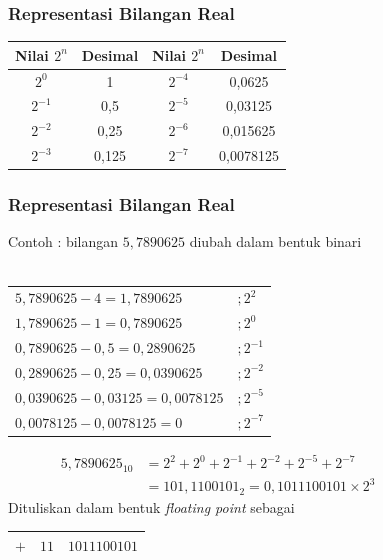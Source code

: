 \documentclass{beamer}
\begin{document}
\begin{frame}
\frametitle{Representasi Bilangan Real}
\begin{center}
\begin{tabular}{|c|c|c|c|}
\hline
	Nilai $2^n$ & Desimal & Nilai $2^n$ & Desimal\\
\hline
	$2^{0}$ & 1 & $2^{-4}$ & 0,0625\\
\hline
	$2^{-1}$ & 0,5 & $2^{-5}$ & 0,03125\\
\hline
	$2^{-2}$ & 0,25 & $2^{-6}$ & 0,015625\\
\hline
	$2^{-3}$ & 0,125 & $2^{-7}$ & 0,0078125\\
\hline
\end{tabular}
\end{center}
\end{frame}


\begin{frame}
\frametitle{Representasi Bilangan Real}
Contoh : bilangan $5,7890625$ diubah dalam bentuk binari\\\ \\
\begin{tabular}{ll}
$5,7890625 - \boxed{4} = 1,7890625 $&$;2^{2}$
\\$1,7890625 - \boxed{1} = 0,7890625 $&$;2^{0}$
\\$0,7890625 - \boxed{0,5} = 0,2890625 $&$;2^{-1}$
\\$0,2890625 - \boxed{0,25} = 0,0390625 $&$;2^{-2}$
\\$0,0390625 - \boxed{0,03125} = 0,0078125 $&$;2^{-5}$
\\$0,0078125 - \boxed{0,0078125} = 0 $&$;2^{-7}$
\end{tabular}
\begin{equation}
\begin{split}
5,7890625_{10}&=2^2+2^0+2^{-1}+2^{-2}+2^{-5}+2^{-7} 
\\&= 101,1100101_2 = 0,1011100101 \times 2^3 \qquad \qquad \qquad
\end{split}
\nonumber
\end{equation}
Dituliskan dalam bentuk \textit{floating point} sebagai
\begin{center}
\begin{tabular}{|c|c|c|}
\hline
	$+$ & $11$ & $1011100101$\\
\hline
\end{tabular}
\end{center}
\end{frame}
\end{document}

